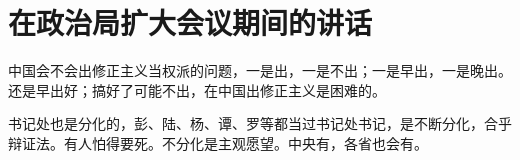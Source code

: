 \section[在政治局扩大会议期间的讲话（一九六六年四月十六日至二十五日）]{在政治局扩大会议期间的讲话}


中国会不会出修正主义当权派的问题，一是出，一是不出；一是早出，一是晚出。还是早出好；搞好了可能不出，在中国出修正主义是困难的。

书记处也是分化的，彭、陆、杨、谭、罗等都当过书记处书记，是不断分化，合乎辩证法。有人怕得要死。不分化是主观愿望。中央有，各省也会有。

